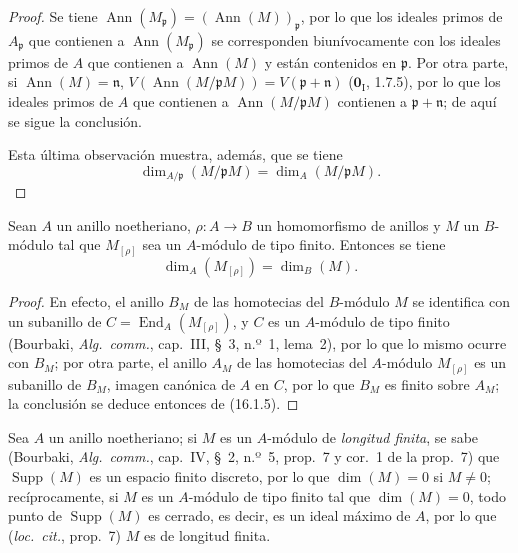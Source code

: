 \begin{proof}
Se tiene
$\operatorname{Ann}(M_{\mathfrak{p}})=(\operatorname{Ann}(M))_{\mathfrak{p}}$,
por lo que los ideales primos de $A_{\mathfrak{p}}$ que contienen a
$\operatorname{Ann}(M_{\mathfrak{p}})$ se corresponden biunívocamente con los
ideales primos de $A$ que contienen a $\operatorname{Ann}(M)$ y están
contenidos en $\mathfrak{p}$. Por otra parte, si
$\operatorname{Ann}(M)=\mathfrak{n}$,
$V(\operatorname{Ann}(M/\mathfrak{p}M))=V(\mathfrak{p}+\mathfrak{n})$
($\mathbf{0}_{\mathrm I}$, 1.7.5), por lo que los ideales primos de $A$ que contienen a
$\operatorname{Ann}(M/\mathfrak{p}M)$ contienen a
$\mathfrak{p}+\mathfrak{n}$; de aquí se sigue la conclusión.

Esta última observación muestra, además, que se tiene
\[
\label{0.16.1.8.2-es}
  \dim_{A/\mathfrak{p}}(M/\mathfrak{p}M)=\dim_A(M/\mathfrak{p}M).
\tag{16.1.8.2}
\]
\end{proof}

\begin{proposition}[16.1.9]
\label{0.16.1.9-es}
Sean $A$ un anillo noetheriano, $\rho:A\to B$ un homomorfismo de anillos y $M$
un $B$-módulo tal que $M_{[\rho]}$ sea un $A$-módulo de tipo finito. Entonces
se tiene
\[
\label{0.16.1.9.1-es}
  \dim_A(M_{[\rho]})=\dim_B(M).
\tag{16.1.9.1}
\]
\end{proposition}

\begin{proof}
En efecto, el anillo $B_M$ de las homotecias del $B$-módulo $M$ se identifica
con un subanillo de $C=\operatorname{End}_A(M_{[\rho]})$, y $C$ es un
$A$-módulo de tipo finito (Bourbaki, \emph{Alg.~comm.}, cap.~III, \S~3,
n.º~1, lema~2), por lo que lo mismo ocurre con $B_M$; por otra parte, el
anillo $A_M$ de las homotecias del $A$-módulo $M_{[\rho]}$ es un subanillo de
$B_M$, imagen canónica de $A$ en $C$, por lo que $B_M$ es finito sobre $A_M$;
la conclusión se deduce entonces de (16.1.5).
\end{proof}

\begin{env}[16.1.10]
\label{0.16.1.10-es}
Sea $A$ un anillo noetheriano; si $M$ es un $A$-módulo de \emph{longitud finita}, se
sabe (Bourbaki, \emph{Alg.~comm.}, cap.~IV, \S~2, n.º~5, prop.~7 y cor.~1 de
la prop.~7) que $\operatorname{Supp}(M)$ es un espacio finito discreto, por lo
que $\dim(M)=0$ si $M\neq0$; recíprocamente, si $M$ es un $A$-módulo de tipo
finito tal que $\dim(M)=0$, todo punto de $\operatorname{Supp}(M)$ es cerrado,
es decir, es un ideal máximo de $A$, por lo que (\emph{loc.~cit.}, prop.~7)
$M$ es de longitud finita.
\end{env}
